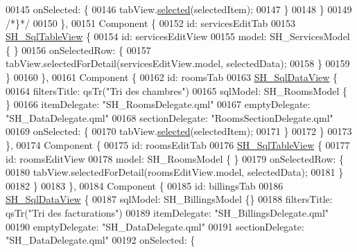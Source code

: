 \begin{DoxyCode}
00145                 onSelected: \{
00146                     tabView.\hyperlink{classSH__SqlDataView_a95366e3f65b183e8c82381e90b5ddc94}{selected}(selectedItem);
00147                 \}
00148             \}
00149             \textcolor{comment}{/*\}*/}
00150         \},
00151         Component \{
00152             \textcolor{keywordtype}{id}: servicesEditTab
00153             \hyperlink{classSH__SqlTableView}{SH\_SqlTableView} \{
00154                 \textcolor{keywordtype}{id}: servicesEditView
00155                 model: SH\_ServicesModel \{ \}
00156                 onSelectedRow: \{
00157                     tabView.selectedForDetail(servicesEditView.model, selectedData);
00158                 \}
00159             \}
00160         \},
00161         Component \{
00162             \textcolor{keywordtype}{id}: roomsTab
00163             \hyperlink{classSH__SqlDataView}{SH\_SqlDataView} \{
00164                 filtersTitle: qsTr(\textcolor{stringliteral}{"Tri des chambres"})
00165                 sqlModel: SH\_RoomsModel \{ \}
00166                 itemDelegate: \textcolor{stringliteral}{"SH\_RoomsDelegate.qml"}
00167                 emptyDelegate: \textcolor{stringliteral}{"SH\_DataDelegate.qml"}
00168                 sectionDelegate: \textcolor{stringliteral}{"RoomsSectionDelegate.qml"}
00169                 onSelected: \{
00170                     tabView.\hyperlink{classSH__SqlDataView_a95366e3f65b183e8c82381e90b5ddc94}{selected}(selectedItem);
00171                 \}
00172             \}
00173         \},
00174         Component \{
00175             \textcolor{keywordtype}{id}: roomsEditTab
00176             \hyperlink{classSH__SqlTableView}{SH\_SqlTableView} \{
00177                 \textcolor{keywordtype}{id}: roomsEditView
00178                 model: SH\_RoomsModel \{ \}
00179                 onSelectedRow: \{
00180                     tabView.selectedForDetail(roomsEditView.model, selectedData);
00181                 \}
00182             \}
00183         \},
00184         Component \{
00185             \textcolor{keywordtype}{id}: billingsTab
00186             \hyperlink{classSH__SqlDataView}{SH\_SqlDataView} \{
00187                 sqlModel: SH\_BillingsModel \{\}
00188                 filtersTitle: qsTr(\textcolor{stringliteral}{"Tri des facturations"})
00189                 itemDelegate: \textcolor{stringliteral}{"SH\_BillingsDelegate.qml"}
00190                 emptyDelegate: \textcolor{stringliteral}{"SH\_DataDelegate.qml"}
00191                 sectionDelegate: \textcolor{stringliteral}{"SH\_DataDelegate.qml"}
00192                 onSelected: \{

\end{DoxyCode}
